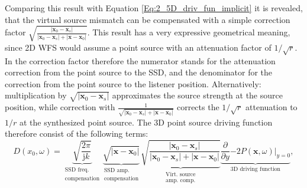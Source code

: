 \documentclass[12pt,a4paper]{article}
\newcommand{\ti}{\mathrm{j}}
\newcommand{\vx}{\mathbf{x}}
\newcommand{\vxo}{\mathbf{x}_0}
\begin{document}
Comparing this result with Equation \eqref{Eq:2_5D_driv_fun_implicit} it is revealed, that the virtual source mismatch can be compensated with a simple correction factor $\sqrt{\frac{| \vxo - \mathbf{x}_s |  }{| \vxo - \mathbf{x}_s | + | \vx - \vxo| }}$. This result has a very expressive geometrical meaning, since 2D WFS would assume a point source with an attenuation factor of $1/\sqrt{r}$. In the correction factor therefore the numerator stands for the attenuation correction from the point source to the SSD, and the denominator for the correction from the point source to the listener position. Alternatively: multiplication by $\sqrt{| \vxo - \mathbf{x}_s |}$ approximates the source strength at the source position, while correction with $\frac{1}{\sqrt{| \vxo - \mathbf{x}_s | + | \vx - \vxo| }}$ corrects the $1/\sqrt{r}$ attenuation to $1/r$ at the synthesized point source.
The 3D point source driving function therefore consist of the following terms:
\begin{equation}
D(x_0,\omega) = 
\underbrace{\sqrt{\frac{2\pi}{\ti k}}}_{\substack{\text{SSD freq.}\\\text{compensation}}} 
\underbrace{\sqrt{ | \vx - \vxo|}}_{\substack{\text{SSD amp.}\\\text{compensation}}} 
\underbrace{\sqrt{\frac{| \vxo - \mathbf{x}_s |  }{| \vxo - \mathbf{x}_s | + | \vx - \vxo| }}  }_
{\substack{\text{Virt. source}\\\text{amp. comp.}}}
\underbrace{ \frac{\partial}{\partial y} \left. -2 P(\vx,\omega) \right|_{y = 0}}_{\text{3D driving function}},
\end{equation}
\end{document}
